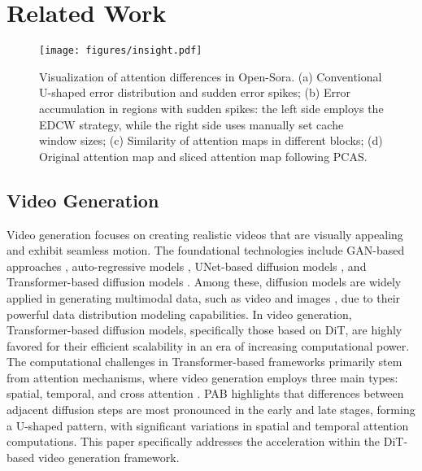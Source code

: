 \section{Related Work}
\label{sec:related_work}
\begin{figure*}[t] %
    \centering
    \texttt{[image: figures/insight.pdf]} 
    \caption{Visualization of attention differences in Open-Sora. (a) Conventional U-shaped error distribution and sudden error spikes; (b) Error accumulation in regions with sudden spikes: the left side employs the EDCW strategy, while the right side uses manually set cache window sizes; (c) Similarity of attention maps in different blocks; (d) Original attention map and sliced attention map following PCAS.}
    \label{fig:Observations}
    \vspace{-5mm}
\end{figure*}

\subsection{Video Generation}
Video generation focuses on creating realistic videos that are visually appealing and exhibit seamless motion.
The foundational technologies include GAN-based approaches \cite{saito2017temporal,wang2018video}, auto-regressive models \cite{weissenborn2019scaling}, UNet-based diffusion models \cite{blattmann2023stable,ho2022video}, and Transformer-based diffusion models \cite{ma2024latte,hong2022cogvideo,yang2024cogvideox,xu2024vasa}. Among these, diffusion models are widely applied in generating multimodal data, such as video and images \cite{rombach2022high,esser2024scaling}, due to their powerful data distribution modeling capabilities. 
In video generation, Transformer-based diffusion models, specifically those based on DiT, are highly favored for their efficient scalability in an era of increasing computational power.
The computational challenges in Transformer-based frameworks primarily stem from attention mechanisms, where video generation employs three main types: spatial, temporal, and cross attention \cite{ma2024latte,yang2024cogvideox,blattmann2023stable,kong2024hunyuanvideo}. PAB \cite{zhao2024pab} highlights that differences between adjacent diffusion steps are most pronounced in the early and late stages, forming a U-shaped pattern, with significant variations in spatial and temporal attention computations.
This paper specifically addresses the acceleration within the DiT-based video generation framework.


